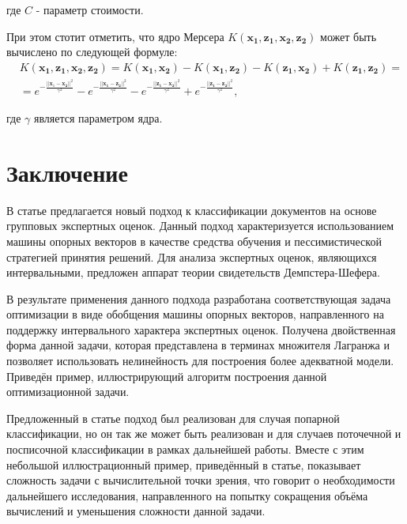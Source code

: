 \documentclass[12pt,a4paper,oneside]{article}
\begin{document}
\par
где \(C\) - параметр стоимости. 

\par
При этом стотит отметить, что ядро Мерсера \(K(\mathbf{x_1},\mathbf{z_1},\mathbf{x_2},\mathbf{z_2})\) может быть вычислено по следующей формуле:
\mbox{}
\begin{eqnarray*}
&K(\mathbf{x_1}, \mathbf{z_1}, \mathbf{x_2}, \mathbf{z_2}) = K(\mathbf{x_1}, \mathbf{x_2}) - K(\mathbf{x_1}, \mathbf{z_2}) - K(\mathbf{z_1}, \mathbf{x_2}) + K(\mathbf{z_1}, \mathbf{z_2}) = \\
&= e^{-\frac{||\mathbf{x}_1-\mathbf{x_2}||^2}{\gamma^{2}}} 
- e^{-\frac{||\mathbf{x_1}-\mathbf{z_2}||^2}{\gamma^{2}}} 
- e^{-\frac{||\mathbf{z_1}-\mathbf{x_2}||^2}{\gamma^{2}}} 
+ e^{-\frac{||\mathbf{z_1}-\mathbf{z_2}||^2}{\gamma^{2}}},
\end{eqnarray*}

\par
где \(\gamma\) является параметром ядра. 

\section{Заключение}
\label{sec:conclusions}

\par
В статье предлагается новый подход к классификации документов на основе групповых экспертных оценок.
Данный подход характеризуется использованием машины опорных векторов в качестве средства обучения и пессимистической стратегией принятия решений. 
Для анализа экспертных оценок, являющихся интервальными, предложен аппарат теории свидетельств Демпстера-Шефера. 
\par
В результате применения данного подхода разработана соответствующая задача оптимизации в виде обобщения машины опорных векторов, направленного на поддержку интервального характера экспертных оценок. 
Получена двойственная форма данной задачи, которая представлена в терминах множителя Лагранжа и позволяет использовать нелинейность для построения более адекватной модели. 
Приведён пример, иллюстрирующий алгоритм построения данной оптимизационной задачи. 
\par
Предложенный в статье подход был реализован для случая попарной классификации, но он так же может быть реализован и для случаев поточечной и посписочной классификации в рамках дальнейшей работы. 
Вместе с этим небольшой иллюстрационный пример, приведённый в статье, показывает сложность задачи с вычислительной точки зрения, что говорит о необходимости дальнейшего исследования, направленного на попытку сокращения объёма вычислений и уменьшения сложности данной задачи. 
\end{document}
